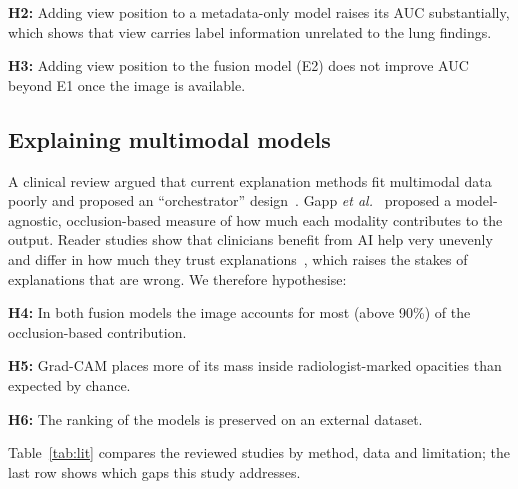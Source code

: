 \documentclass[conference]{IEEEtran}
\begin{document}
\textbf{H2:} Adding view position to a metadata-only model raises its AUC substantially, which shows that view carries label information unrelated to the lung findings.

\textbf{H3:} Adding view position to the fusion model (E2) does not improve AUC beyond E1 once the image is available.

\subsection{Explaining multimodal models}
A clinical review argued that current explanation methods fit multimodal data poorly and proposed an ``orchestrator'' design~\cite{pahud2024orchestrating}. Gapp \emph{et al.}~\cite{gapp2025modality} proposed a model-agnostic, occlusion-based measure of how much each modality contributes to the output. Reader studies show that clinicians benefit from AI help very unevenly~\cite{yu2024heterogeneity} and differ in how much they trust explanations~\cite{nicolson2025human}, which raises the stakes of explanations that are wrong. We therefore hypothesise:

\textbf{H4:} In both fusion models the image accounts for most (above 90\%) of the occlusion-based contribution.

\textbf{H5:} Grad-CAM places more of its mass inside radiologist-marked opacities than expected by chance.

\textbf{H6:} The ranking of the models is preserved on an external dataset.

Table~\ref{tab:lit} compares the reviewed studies by method, data and limitation; the last row shows which gaps this study addresses.
\end{document}
